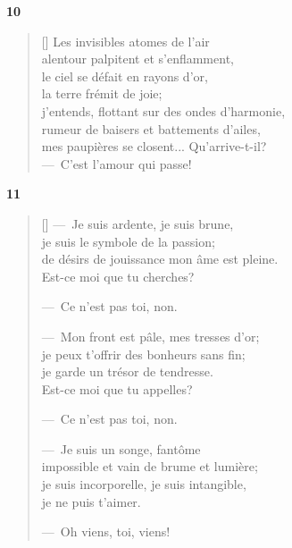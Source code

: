 \documentclass[a4paper,12pt]{book}
\begin{document}
\bigskip

\begin{center}
  \textbf{10}
\end{center}

\settowidth{\versewidth}{Dis-moi...? Silence! C'est l'amour qui passe!}

\begin{verse}[\versewidth]
  Les invisibles atomes de l'air \\
  alentour palpitent et s'enflamment, \\
  le ciel se défait en rayons d'or, \\
  la terre frémit de joie; \\
  j'entends, flottant sur des ondes d'harmonie, \\
  rumeur de baisers et battements d'ailes, \\
  mes paupières se closent... Qu'arrive-t-il? \\
  ---~C'est l'amour qui passe!
\end{verse}

\bigskip

\begin{center}
  \textbf{11}
\end{center}

\settowidth{\versewidth}{de désirs de jouissance mon âme est pleine.}

\begin{verse}[\versewidth]
  ---~Je suis ardente, je suis brune, \\
  je suis le symbole de la passion; \\
  de désirs de jouissance mon âme est pleine. \\
  Est-ce moi que tu cherches?

  \hfill ---~Ce n'est pas toi, non.

  ---~Mon front est pâle, mes tresses d'or; \\
  je peux t'offrir des bonheurs sans fin; \\
  je garde un trésor de tendresse. \\
  Est-ce moi que tu appelles?

  \hfill ---~Ce n'est pas toi, non.

  ---~Je suis un songe, fantôme \\
  impossible et vain de brume et lumière; \\
  je suis incorporelle, je suis intangible, \\
  je ne puis t'aimer.

  \hfill ---~Oh viens, toi, viens!
\end{verse}
\end{document}
